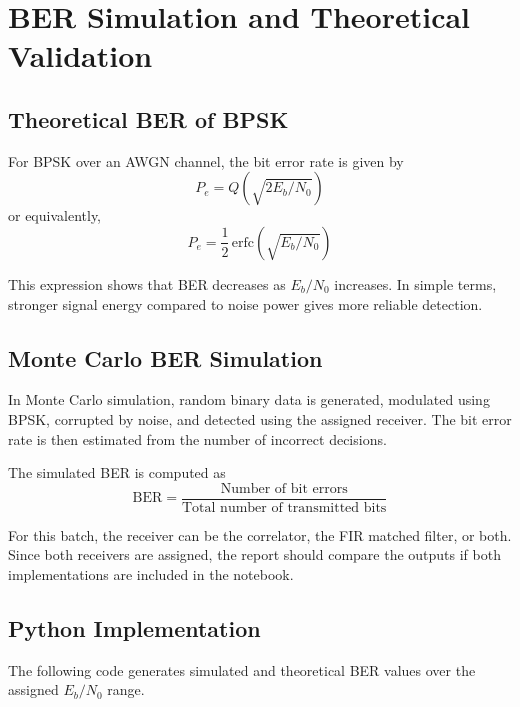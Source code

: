 \chapter{BER Simulation and Theoretical Validation}

\section{Theoretical BER of BPSK}
For BPSK over an AWGN channel, the bit error rate is given by
\[
P_e = Q\left(\sqrt{2E_b/N_0}\right)
\]
or equivalently,
\[
P_e = \frac{1}{2}\,\mathrm{erfc}\left(\sqrt{E_b/N_0}\right)
\]

This expression shows that BER decreases as \(E_b/N_0\) increases. In simple terms, 
stronger signal energy compared to noise power gives more reliable detection.

\section{Monte Carlo BER Simulation}
In Monte Carlo simulation, random binary data is generated, modulated using BPSK, 
corrupted by noise, and detected using the assigned receiver. The bit error rate is then 
estimated from the number of incorrect decisions.

The simulated BER is computed as
\[
\text{BER} = \frac{\text{Number of bit errors}}{\text{Total number of transmitted bits}}
\]

For this batch, the receiver can be the correlator, the FIR matched filter, or both. 
Since both receivers are assigned, the report should compare the outputs if both implementations 
are included in the notebook.

\section{Python Implementation}
The following code generates simulated and theoretical BER values over the assigned \(E_b/N_0\) range.

